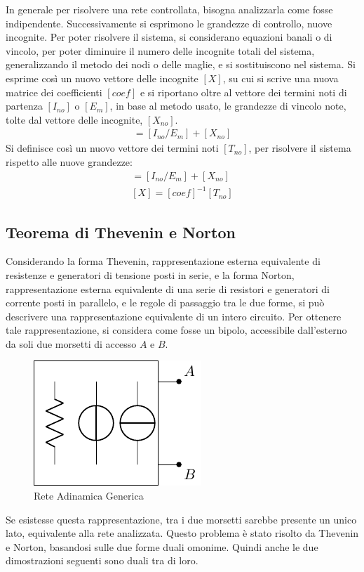 \documentclass{article}
\numberwithin{equation}{subsection}
\begin{document}

In generale per risolvere una rete controllata, bisogna analizzarla come fosse indipendente. Successivamente si esprimono le grandezze di controllo, nuove 
incognite. Per poter risolvere il sistema, si considerano equazioni banali o di vincolo, per poter diminuire il numero delle incognite totali del sistema, generalizzando il 
metodo dei nodi o delle maglie, e si sostituiscono nel sistema. Si esprime così un nuovo vettore delle incognite $[X]$, su cui si scrive una nuova matrice 
dei coefficienti $[coef]$ e si riportano oltre al vettore dei termini noti di partenza $[I_{no}]$ o $[E_m]$, in base al metodo usato, le grandezze di vincolo note, tolte dal 
vettore delle incognite, $[X_{no}]$. 
\begin{gather*}
    [coef][X]=[I_{no}/E_m]+[X_{no}]
\end{gather*}
Si definisce così un nuovo vettore dei termini noti $[T_{no}]$, per risolvere il sistema rispetto alle nuove grandezze:
\begin{gather*}
    [T_{no}]=[I_{no}/E_m]+[X_{no}]\\
    [X]=[coef]^{-1}[T_{no}]
\end{gather*}

%

\subsection{Teorema di Thevenin e Norton}

Considerando la forma Thevenin, rappresentazione esterna equivalente di resistenze e generatori di tensione posti in serie, e la forma Norton, rappresentazione 
esterna equivalente di una serie di resistori e generatori di corrente posti in parallelo, e le regole di passaggio tra le due forme, si può descrivere una rappresentazione 
equivalente di un intero circuito.  
Per ottenere tale rappresentazione, si considera come fosse un bipolo, accessibile dall'esterno da soli due morsetti di accesso $A$ e $B$.
\begin{figure}[H]%
    \centering
    \includegraphics{rete-adinamica-generica.pdf}
    \caption{Rete Adinamica Generica}
    \label{fig:rete-adinamica-generica}
\end{figure}
Se esistesse questa rappresentazione, tra i due morsetti sarebbe presente un unico lato, equivalente alla rete analizzata. Questo problema è stato risolto da Thevenin e Norton, 
basandosi sulle due forme duali omonime. Quindi anche le due dimostrazioni seguenti sono duali tra di loro.
\end{document}
